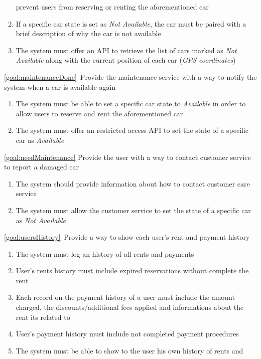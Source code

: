 \begin{description}
\begin{enumerate}[resume*]
   				prevent users from reserving or renting the aforementioned car
   				\item If a specific car state is set as \emph{Not Available}, the car must be paired
   				with a brief description of why the car is not available
   				\item The system must offer an API to retrieve the list of cars marked as \emph{Not
   				Available} along with the current position of each car (\emph{GPS coordinates})
  			\end{enumerate}
		\item \ref{goal:maintenanceDone}\ Provide the maintenance service with a way to notify the system when a car is available again
			\begin{enumerate}[resume*]
   				\item The system must be able to set a specific car state to \emph{Available} in order 
   				to allow users to reserve and rent the aforementioned car
   				\item The system must offer an restricted access API
   				to set the state of a specific car as \emph{Available}
  			\end{enumerate}
  		\item \ref{goal:needMaintenance} Provide the user with a way to contact customer service to report a damaged car
  		\begin{enumerate}[resume*]
  			\item The system should provide information about how to contact customer care
  			service
   			\item The system must allow the customer service to set the state of a specific car as
   			\emph{Not Available}	
  		\end{enumerate}
  		\item \ref{goal:usersHistory}\ Provide a way to show each user's rent and payment history
  			\begin{enumerate}[resume*]
  				\item The system must log an history of all rents and payments
  				\item User's rents history must include expired reservations without complete the rent
  				\item Each record on the payment history of a user must include the amount charged,
  				the discounts/additional fees applied and informations about the rent its related to
  				\item User's payment history must include not completed payment procedures
  				\item The system must be able to show to the user his own history of rents and

\end{enumerate}
\end{description}
